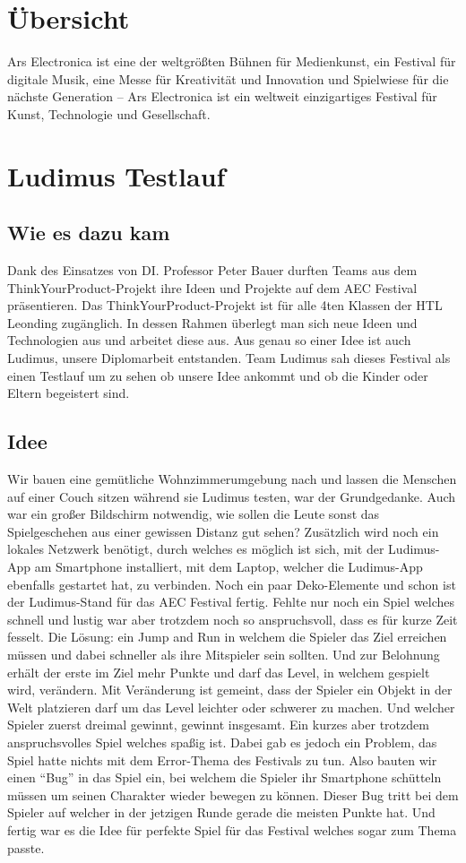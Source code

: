 \section{Übersicht}
Ars Electronica ist eine der weltgrößten Bühnen für Medienkunst, ein Festival für digitale Musik, eine Messe für Kreativität und Innovation und Spielwiese für die nächste Generation – Ars Electronica ist ein weltweit einzigartiges Festival für Kunst, Technologie und Gesellschaft.
\section{Ludimus Testlauf}
\subsection{Wie es dazu kam}
Dank des Einsatzes von DI. Professor Peter Bauer durften Teams aus dem ThinkYourProduct-Projekt ihre Ideen und Projekte auf dem AEC Festival präsentieren. Das ThinkYourProduct-Projekt ist für alle 4ten Klassen der HTL Leonding zugänglich. In dessen Rahmen überlegt man sich neue Ideen und Technologien aus und arbeitet diese aus. Aus genau so einer Idee ist auch Ludimus, unsere Diplomarbeit entstanden. Team Ludimus sah dieses Festival als einen Testlauf um zu sehen ob unsere Idee ankommt und ob die Kinder oder Eltern begeistert sind.
\subsection{Idee}\label{aecerror}
Wir bauen eine gemütliche Wohnzimmerumgebung nach und lassen die Menschen auf einer Couch sitzen während sie Ludimus testen, war der Grundgedanke. Auch war ein großer Bildschirm notwendig, wie sollen die Leute sonst das Spielgeschehen aus einer gewissen Distanz gut sehen? Zusätzlich wird noch ein lokales Netzwerk benötigt, durch welches es möglich ist sich, mit der Ludimus-App am Smartphone installiert, mit dem Laptop, welcher die Ludimus-App ebenfalls gestartet hat, zu verbinden. Noch ein paar Deko-Elemente und schon ist der Ludimus-Stand für das AEC Festival fertig. Fehlte nur noch ein Spiel welches schnell und lustig war aber trotzdem noch so anspruchsvoll, dass es für kurze Zeit fesselt. Die Lösung: ein Jump and Run in welchem die Spieler das Ziel erreichen müssen und dabei schneller als ihre Mitspieler sein sollten. Und zur Belohnung erhält der erste im Ziel mehr Punkte und darf das Level, in welchem gespielt wird, verändern. Mit Veränderung ist gemeint, dass der Spieler ein Objekt in der Welt platzieren darf um das Level leichter oder schwerer zu machen. Und welcher Spieler zuerst dreimal gewinnt, gewinnt insgesamt. Ein kurzes aber trotzdem anspruchsvolles Spiel welches spaßig ist. Dabei gab es jedoch ein Problem, das Spiel hatte nichts mit dem Error-Thema des Festivals zu tun. Also bauten wir einen “Bug” in das Spiel ein, bei welchem die Spieler ihr Smartphone schütteln müssen um seinen Charakter wieder bewegen zu können. Dieser Bug tritt bei dem Spieler auf welcher in der jetzigen Runde gerade die meisten Punkte hat. Und fertig war es die Idee für perfekte Spiel für das Festival welches sogar zum Thema passte. 
